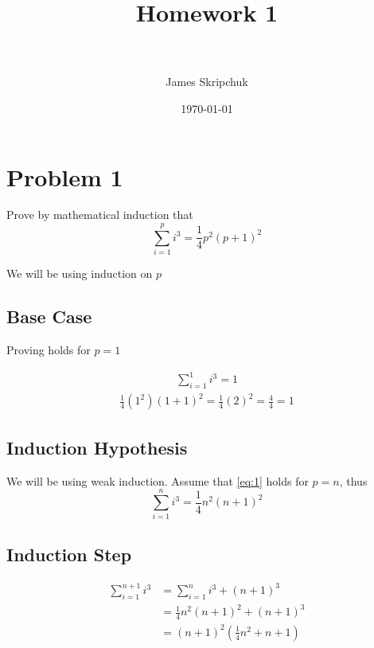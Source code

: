 \documentclass[paper=a4, fontsize=11pt]{scrartcl} %
\title{	
\normalfont \normalsize 
\huge Homework 1 \\ %
\horrule{0.4pt} \\[0.5cm] %
}
\author{James Skripchuk} %
\date{\normalsize\today} %
\numberwithin{equation}{section} %
\numberwithin{figure}{section} %
\numberwithin{table}{section} %
\begin{document}
\maketitle %


\section{Problem 1}

Prove by mathematical induction that 
\begin{equation} \label{eq:1}
\sum_{i=1}^{p} i^3 = \frac{1}{4}p^2(p+1)^2
\end{equation}

We will be using induction on $p$




\subsection{Base Case}

Proving holds for $p=1$

\begin{align}
\sum_{i=1}^{1} i^3 = 1
\end{align}
\begin{align}
\frac{1}{4}(1^2)(1+1)^2 = \frac{1}{4}(2)^2 = \frac{4}{4} = 1
\end{align}

\subsection{Induction Hypothesis}
We will be using weak induction. Assume that \ref{eq:1} holds for $p=n$, thus
\begin{equation} \label{eq:2}
\sum_{i=1}^{n} i^3 = \frac{1}{4}n^2(n+1)^2
\end{equation} 

\subsection{Induction Step}
\begin{align} 
\sum_{i=1}^{n+1} i^3 	&= \sum_{i=1}^{n} i^3 + (n+1)^3 \tag*{}\\
&=\frac{1}{4}n^2(n+1)^2 + (n+1)^3 \tag*{By Induction Hypothesis}\\
&=(n+1)^2(\frac{1}{4}n^2+n+1) \tag*{}
\end{align}
\end{document}
